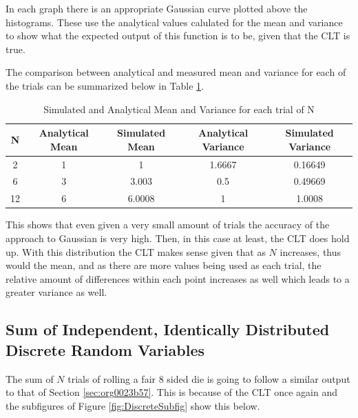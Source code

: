 \documentclass[a4paper, 11pt]{article}
\begin{document}
\medskip
\noindent
In each graph there is an appropriate Gaussian curve plotted above the histograms. These use the analytical values calulated for the mean and variance to show what the expected output of this function is to be, given that the CLT is true.

\medskip
\noindent
The comparison between analytical and measured mean and variance for each of the trials can be summarized below in Table \ref{tab:UniformTable}.

\begin{table}[htbp]
\caption{\label{tab:UniformTable}Simulated and Analytical Mean and Variance for each trial of N}
\centering
\begin{tabular}{|c|c|c|c|c|}
\hline
N & Analytical Mean & Simulated Mean & Analytical Variance & Simulated Variance\\
\hline
2 & 1 & 1 & 1.6667 & 0.16649\\
6 & 3 & 3.003 & 0.5 & 0.49669\\
12 & 6 & 6.0008 & 1 & 1.0008\\
\hline
\end{tabular}
\end{table}

\noindent
This shows that even given a very small amount of trials the accuracy of the approach to Gaussian is very high. Then, in this case at least, the CLT does hold up. With this distribution the CLT makes sense given that as \(N\) increases, thus would the mean, and as there are more values being used as each trial, the relative amount of differences within each point increases as well which leads to a greater variance as well.


\subsection{Sum of Independent, Identically Distributed Discrete Random Variables}
\label{sec:org23375f9}
The sum of \(N\) trials of rolling a fair 8 sided die is going to follow a similar output to that of Section \ref{sec:org0023b57}. This is because of the CLT once again and the subfigures of Figure \ref{fig:DiscreteSubfig} show this below.
\end{document}
